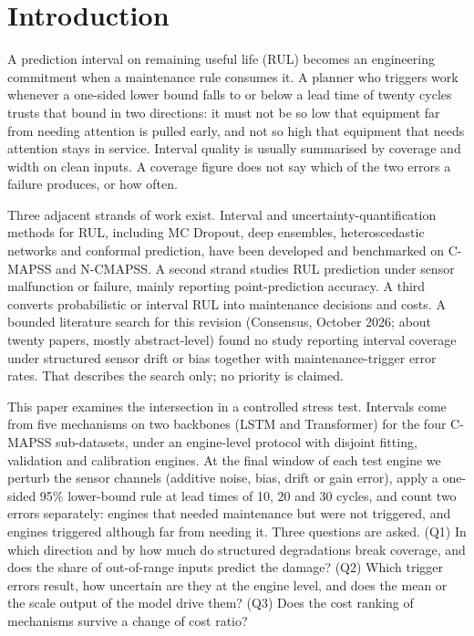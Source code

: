 \section{Introduction}
A prediction interval on remaining useful life (RUL) becomes an engineering commitment when a maintenance rule consumes it. A planner who triggers work whenever a one-sided lower bound falls to or below a lead time of twenty cycles trusts that bound in two directions: it must not be so low that equipment far from needing attention is pulled early, and not so high that equipment that needs attention stays in service. Interval quality is usually summarised by coverage and width on clean inputs. A coverage figure does not say which of the two errors a failure produces, or how often.

Three adjacent strands of work exist. Interval and uncertainty-quantification methods for RUL, including MC Dropout, deep ensembles, heteroscedastic networks and conformal prediction, have been developed and benchmarked on C-MAPSS and N-CMAPSS.\cite{peng2019,basora2025,zhan2024,piao2025,mao2024,xu2021,xu2026} A second strand studies RUL prediction under sensor malfunction or failure, mainly reporting point-prediction accuracy.\cite{xu2023,tang2026,hachem2024} A third converts probabilistic or interval RUL into maintenance decisions and costs.\cite{kim2020,lee2022,zhu2025} A bounded literature search for this revision (Consensus, October 2026; about twenty papers, mostly abstract-level) found no study reporting interval coverage under structured sensor drift or bias together with maintenance-trigger error rates. That describes the search only; no priority is claimed.

This paper examines the intersection in a controlled stress test. Intervals come from five mechanisms on two backbones (LSTM and Transformer) for the four C-MAPSS sub-datasets, under an engine-level protocol with disjoint fitting, validation and calibration engines. At the final window of each test engine we perturb the sensor channels (additive noise, bias, drift or gain error), apply a one-sided 95\% lower-bound rule at lead times of 10, 20 and 30 cycles, and count two errors separately: engines that needed maintenance but were not triggered, and engines triggered although far from needing it. Three questions are asked. (Q1) In which direction and by how much do structured degradations break coverage, and does the share of out-of-range inputs predict the damage? (Q2) Which trigger errors result, how uncertain are they at the engine level, and does the mean or the scale output of the model drive them? (Q3) Does the cost ranking of mechanisms survive a change of cost ratio?


